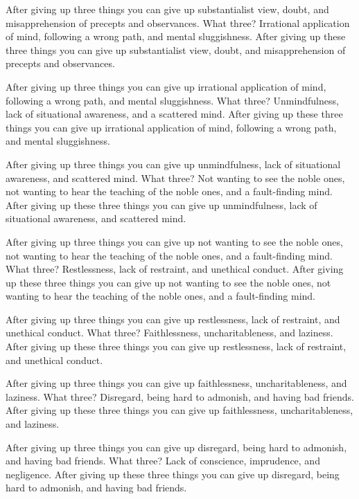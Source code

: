 \documentclass[12pt,openany]{book}%
\begin{document}
After giving up three things you can give up substantialist view, doubt, and misapprehension of precepts and observances. What three? Irrational application of mind, following a wrong path, and mental sluggishness. After giving up these three things you can give up substantialist view, doubt, and misapprehension of precepts and observances. 

After giving up three things you can give up irrational application of mind, following a wrong path, and mental sluggishness. What three? Unmindfulness, lack of situational awareness, and a scattered mind. After giving up these three things you can give up irrational application of mind, following a wrong path, and mental sluggishness. 

After giving up three things you can give up unmindfulness, lack of situational awareness, and scattered mind. What three? Not wanting to see the noble ones, not wanting to hear the teaching of the noble ones, and a fault-finding mind. After giving up these three things you can give up unmindfulness, lack of situational awareness, and scattered mind. 

After giving up three things you can give up not wanting to see the noble ones, not wanting to hear the teaching of the noble ones, and a fault-finding mind. What three? Restlessness, lack of restraint, and unethical conduct. After giving up these three things you can give up not wanting to see the noble ones, not wanting to hear the teaching of the noble ones, and a fault-finding mind. 

After giving up three things you can give up restlessness, lack of restraint, and unethical conduct. What three? Faithlessness, uncharitableness, and laziness. After giving up these three things you can give up restlessness, lack of restraint, and unethical conduct. 

After giving up three things you can give up faithlessness, uncharitableness, and laziness. What three? Disregard, being hard to admonish, and having bad friends. After giving up these three things you can give up faithlessness, uncharitableness, and laziness. 

After giving up three things you can give up disregard, being hard to admonish, and having bad friends. What three? Lack of conscience, imprudence, and negligence. After giving up these three things you can give up disregard, being hard to admonish, and having bad friends. 
\end{document}
